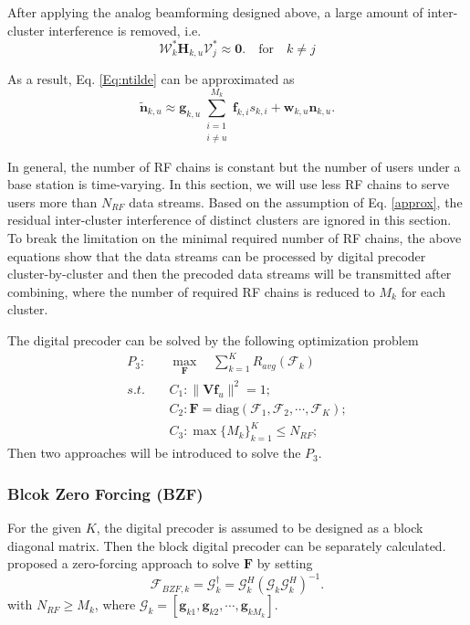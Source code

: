\documentclass[conference]{IEEEtran}
\begin{document}
{After applying the analog beamforming designed above, a large amount of inter-cluster interference is removed, i.e.
\begin{equation}\label{approx}
\bm{\mathcal{W}}^*_{k}\bm{H}_{k,u}\bm{\mathcal{V}}^*_{j} \approx \bm{0}. \quad \text{for} \quad k \neq j
\end{equation}

As a result, Eq. \eqref{Eq:ntilde} can be approximated as
\begin{equation}
\tilde{\bm{n}}_{k,u} \approx \bm{g}_{k,u}\sum_{\substack{i=1\\i\neq u}}^{M_k}\bm{f}_{k,i}s_{k,i}+\bm{w}_{k,u}\bm{n}_{k,u}.
\end{equation}

In general, the number of RF chains is constant but the number of users under a base station is time-varying.  In this section, we will use less RF chains to serve users more than $N_{RF}$ data streams. Based on the assumption of Eq. \eqref{approx}, the residual inter-cluster interference of distinct clusters are ignored in this section. To break the limitation on the minimal required number of RF chains, the above equations show that the data streams can be processed by digital precoder cluster-by-cluster and then the precoded data streams will be transmitted after combining, where the number of required RF chains is reduced to $M_k$ for each cluster.


The digital precoder can be solved by the following optimization problem
\begin{align}\label{eq:digital}
P_3: \quad&\max_{\bm F}\quad \sum_{k=1}^{K} R_{avg}(\bm{\mathcal{F}}_k)\\ \nonumber
s.t. \quad &C_1: \|\bm{Vf}_u\|^2=1;\nonumber\\
&C_2: \bm{F} = \text{diag}(\bm{\mathcal{F}}_1, \bm{\mathcal{F}}_2, \cdots, \bm{\mathcal{F}}_{K});\nonumber\\
&C_3: \max \{M_k\}_{k=1}^K \leq N_{RF};\nonumber
\end{align}
Then two approaches will be introduced to solve the $P_3$.

\subsubsection{Blcok Zero Forcing (BZF)}
For the given $K$, the digital precoder is assumed to be designed as a block diagonal matrix. Then the block digital precoder can be separately calculated. \cite{alkhateeb2014channel} proposed a zero-forcing approach to solve $\bm{F}$ by setting
\begin{equation}
\bm{\mathcal{F}}_{BZF,k} = \bm{\mathcal{G}}_k^\dagger = \bm{\mathcal{G}}_k^H (\bm{\mathcal{G}}_k \bm{\mathcal{G}}_k^H)^{-1}.
\end{equation}
with $N_{RF}\geq M_k$, where $\bm{\mathcal{G}}_k = [\bm{g}_{k1}, \bm{g}_{k2},\cdots,\bm{g}_{kM_k}]$.

}
\end{document}
